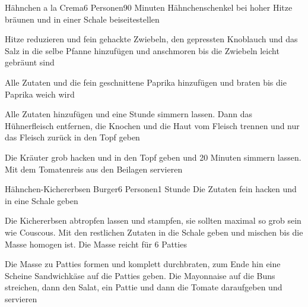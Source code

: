 \begin{recipe}{Hähnchen a la Crema}{6 Personen}{90 Minuten}
Hähnchenschenkel bei hoher Hitze bräunen und in einer Schale beiseitestellen 

Hitze reduzieren und fein gehackte Zwiebeln, den gepressten Knoblauch und das Salz in die selbe Pfanne hinzufügen und anschmoren bis die Zwiebeln leicht gebräunt sind

Alle Zutaten und die fein geschnittene Paprika hinzufügen und braten bis die Paprika weich wird

Alle Zutaten hinzufügen und eine Stunde simmern lassen. Dann das Hühnerfleisch entfernen, die Knochen und die Haut vom Fleisch trennen und nur das Fleisch zurück in den Topf geben

Die Kräuter grob hacken und in den Topf geben und 20 Minuten simmern lassen. Mit dem Tomatenreis aus den Beilagen servieren
\end{recipe}


\begin{recipe}{Hähnchen-Kichererbsen Burger}{6 Personen}{1 Stunde}
Die Zutaten fein hacken und in eine Schale geben

Die Kichererbsen abtropfen lassen und stampfen, sie sollten maximal so grob sein wie Couscous. Mit den restlichen Zutaten in die Schale geben und mischen bis die Masse homogen ist. Die Masse reicht für 6 Patties

Die Masse zu Patties formen und komplett durchbraten, zum Ende hin eine Scheine Sandwichkäse auf die Patties geben. Die Mayonnaise auf die Buns streichen, dann den Salat, ein Pattie und dann die Tomate daraufgeben und servieren
\end{recipe}

